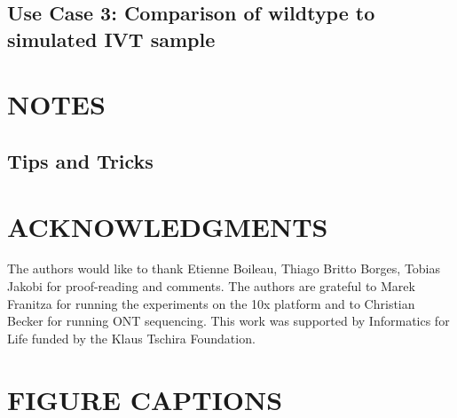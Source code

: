 \documentclass[times, 11pt, a4paper]{article}
\begin{document}
\subsection*{Use Case 3: Comparison of wildtype to simulated IVT sample}


\section*{NOTES}
\subsection*{Tips and Tricks}

\section*{ACKNOWLEDGMENTS}
  The authors would like to thank Etienne Boileau, Thiago Britto Borges, Tobias Jakobi for proof-reading and comments.
  The authors are grateful to Marek Franitza for running the experiments on the 10x platform and to Christian Becker for running ONT sequencing.
  This work was supported by Informatics for Life funded by the Klaus Tschira Foundation.

 

\newpage

\section*{FIGURE CAPTIONS}
\end{document}
